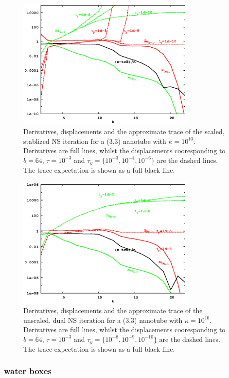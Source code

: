 \documentclass[letterpaper,twocolumn,amsmath,amsfont,amssymb,english,aps,jcp,preprintnumbers,groupaddress,nofootinbib,tightenlines]{revtex4}
\begin{document}
\begin{figure}[h]
\includegraphics[width=3.5in]{fig_33_tube_cond_10_scaled/33_tube_k10_scale_dual.eps}
\caption{Derivatives, displacements and the approximate trace of the scaled, stablized NS iteration for a 
(3,3) nanotube with $\kappa =10^{10}$. 
Derivatives are full lines, whilst the displacements cooresponding to $b=64$, 
$\tau=10^{-3}$ and $\tau_y=\{10^{-3},10^{-4},10^{-6}\}$  
are the dashed lines.  The trace expectation is shown as a full black line. }
\end{figure}


\begin{figure}[h]
\includegraphics[width=3.5in]{fig_33_tube_cond_10_scaled/33_tube_k10_scale_stab.eps}
\caption{Derivatives, displacements and the approximate trace of the unscaled, dual NS iteration for a (3,3) nanotube with $\kappa =10^{10}$. 
Derivatives are full lines, whilst the displacements cooresponding to $b=64$, $\tau=10^{-3}$ and $\tau_y=\{10^{-8}, 10^{-9}, 10^{-10}\}$  
are the dashed lines.  The trace expectation is shown as a full black line. }
\end{figure}

\subsubsection{water boxes}
\end{document}

